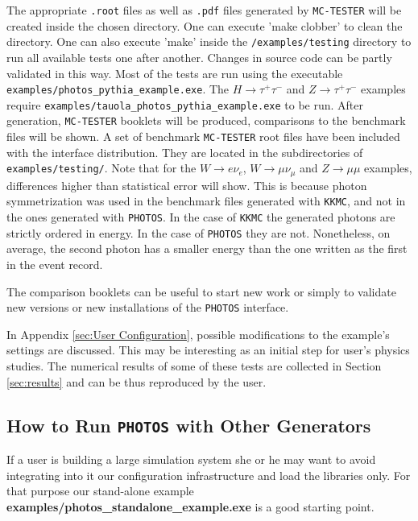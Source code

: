 \documentclass[]{Photos_interface_design}
\begin{document}
The appropriate {\tt .root} files as well as {\tt .pdf} files generated by {\tt MC-TESTER}
will be created inside the chosen directory. One can execute 'make clobber' to
clean the directory. One can also execute 'make' inside the {\tt /examples/testing}
directory to run all available tests one after another. Changes in source
code  can  be partly validated in this way.
Most of the tests are run using the executable {\tt examples/photos\_pythia\_example.exe}. The 
 $H \rightarrow \tau^+ \tau^-$ and $Z \rightarrow \tau^+ \tau^-$ examples 
require
{\tt examples/tauola\_photos\_pythia\_example.exe} to be run.
After generation, {\tt MC-TESTER} booklets will be produced,
 comparisons to the benchmark files will be shown.
A set of benchmark {\tt MC-TESTER} root files have been included with the interface
distribution. They are located in the subdirectories of {\tt examples/testing/}.
Note that for the $W \rightarrow e \nu_e$, 
$W \rightarrow \mu \nu_\mu$ and $Z \rightarrow \mu \mu$
examples,   differences higher than statistical error will show. 
This is because  photon symmetrization
was used in the benchmark files generated with {\tt KKMC}, and not in the ones 
generated with {\tt PHOTOS}.
In the case of {\tt KKMC} the generated photons are strictly ordered in energy. 
In the case of {\tt PHOTOS} they are not. Nonetheless, on average, 
the second photon has a smaller energy than the one written as the first
in the event record.


The comparison booklets can be useful 
to start new work or simply to 
validate new versions or new installations of the {\tt PHOTOS} interface.

In Appendix \ref{sec:User Configuration}, possible modifications to the  
example's settings are discussed. This may be interesting as an initial step for user's 
physics studies.  The numerical results of some of these tests are collected in Section \ref{sec:results}
and can be thus reproduced by the user.

\subsection{How to Run {\tt PHOTOS} with Other Generators}
If a user is building a large simulation system she or he may want to avoid
integrating into it our configuration infrastructure and load the libraries only. 
For that purpose our stand-alone 
example {\bf examples/photos\_standalone\_example.exe} is a good starting point.
\end{document}
